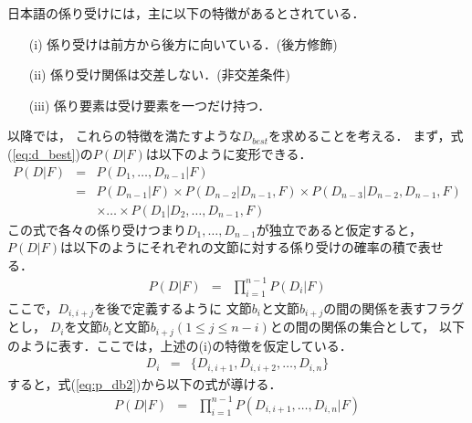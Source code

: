 日本語の係り受けには，主に以下の特徴があるとされている．
\begin{enumerate}
\item[(i)] \mbox{係り受けは前方から後方に向いている．(後方修飾)}
\item[(ii)] 係り受け関係は交差しない．(非交差条件)
\item[(iii)] 係り要素は受け要素を一つだけ持つ．
\end{enumerate}
以降では，
これらの特徴を満たすような$D_{best}$を求めることを考える．
まず，式(\ref{eq:d_best})の$P(D|F)$は以下のように変形できる．
\begin{eqnarray}
  \label{eq:p_db}
  P(D|F) 
  & = & P(D_{1},\ldots,D_{n-1}|F)\nonumber\\
  & = & P(D_{n-1}|F)\times P(D_{n-2}|D_{n-1},F)
  \times P(D_{n-3}|D_{n-2},D_{n-1},F)\nonumber\\
  & & \times\ldots\times P(D_{1}|D_{2},\ldots,D_{n-1},F)
\end{eqnarray}
この式で各々の係り受けつまり$D_{1},\ldots,D_{n-1}$が独立であると仮定すると，
$P(D|F)$は以下のようにそれぞれの文節に対する係り受けの確率の積で表せる．
\begin{eqnarray}
  \label{eq:p_db2}
  P(D|F) 
  & = & \prod_{i=1}^{n-1}P(D_{i}|F)
\end{eqnarray}
ここで，$D_{i,i+j}$を後で定義するように
文節$b_{i}$と文節$b_{i+j}$の間の関係を表すフラグとし，
$D_{i}$を文節$b_{i}$と文節$b_{i+j} (1\leq j\leq n-i)$との間の関係の集合として，
以下のように表す．ここでは，上述の(i)の特徴を仮定している．
\begin{eqnarray}
  \label{eq:d_i}
  D_{i} & = & \{D_{i,i+1},D_{i,i+2},\ldots,D_{i,n}\}
\end{eqnarray}
すると，式(\ref{eq:p_db2})から以下の式が導ける．
\begin{eqnarray}
  \label{eq:p_db3}
  P(D|F) 
  & = & \prod_{i=1}^{n-1}P(D_{i,i+1},\ldots,D_{i,n}|F)
\end{eqnarray}

